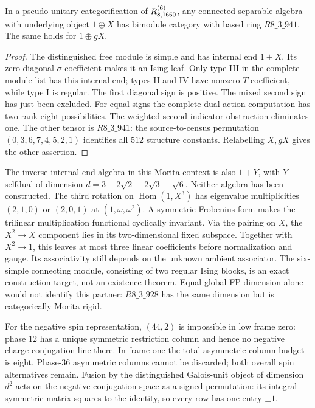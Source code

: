 \begin{proposition}
In a pseudo-unitary categorification of $R^{(6)}_{8,1660}$, any connected
separable algebra with underlying object $1\oplus X$ has bimodule category
with based ring $R8\_3\_941$. The same holds for $1\oplus gX$.
\end{proposition}
\begin{proof}
The distinguished free module is simple and has internal end $1+X$.
Its zero diagonal $\sigma$ coefficient makes it an Ising leaf.
Only type III in the complete module list has this internal end; types II
and IV have nonzero $T$ coefficient, while type I is regular. The first
diagonal sign is positive. The mixed second sign has just been excluded.
For equal signs the complete dual-action computation has two rank-eight
possibilities. The weighted second-indicator obstruction eliminates one.
The other tensor is $R8\_3\_941$: the source-to-census permutation
$(0,3,6,7,4,5,2,1)$ identifies all $512$ structure constants.
Relabelling $X,gX$ gives the other assertion.
\end{proof}

The inverse internal-end algebra in this Morita context is also $1+Y$,
with $Y$ selfdual of dimension $d=3+2\sqrt2+2\sqrt3+\sqrt6$.
Neither algebra has been constructed. The third rotation on $\operatorname{Hom}(1,X^3)$ has eigenvalue multiplicities $(2,1,0)$ or $(2,0,1)$ at $(1,\omega,\omega^2)$. A symmetric Frobenius form makes the trilinear multiplication functional cyclically invariant. Via the pairing on $X$, the $X^2\to X$ component lies in its two-dimensional fixed subspace. Together with $X^2\to1$, this leaves at most three linear coefficients before normalization and gauge. Its associativity
still depends on the unknown ambient associator. The six-simple connecting
module, consisting of two regular Ising blocks, is an exact construction
target, not an existence theorem. Equal global FP dimension alone would
not identify this partner: $R8\_3\_928$ has the same dimension but is
categorically Morita rigid.

For the negative spin representation, $(44,2)$ is impossible in low frame
zero: phase $12$ has a unique symmetric restriction column and hence no
negative charge-conjugation line there. In frame one the total asymmetric
column budget is eight. Phase-$36$ asymmetric columns cannot be discarded;
both overall spin alternatives remain. Fusion by the distinguished
Galois-unit object of dimension $d^2$ acts on the negative conjugation
space as a signed permutation: its integral symmetric matrix squares to
the identity, so every row has one entry $\pm1$.

